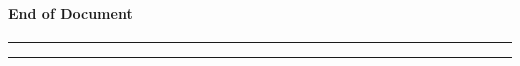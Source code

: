 \documentclass[11pt]{article}
\begin{document}
    
    \begin{center}
    \end{center}
    { \hspace*{\fill} \\}
    
    \hypertarget{end-of-document}{%
\paragraph{End of Document}\label{end-of-document}}

\begin{center}\rule{0.5\linewidth}{\linethickness}\end{center}

\begin{center}\rule{0.5\linewidth}{\linethickness}\end{center}


    
    
    
    
\end{document}
